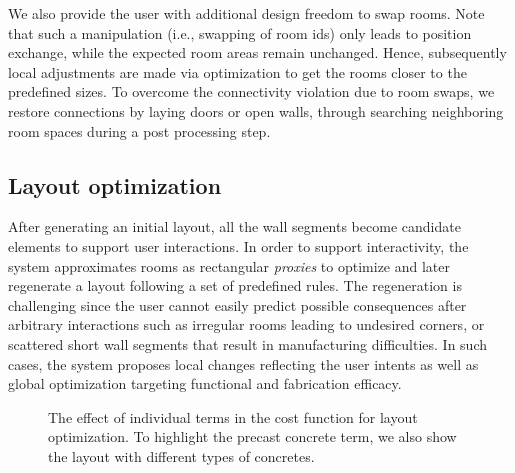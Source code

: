 We also provide the user with additional design freedom to swap rooms. Note that such a manipulation (i.e., swapping of room ids) only leads to position exchange, while the expected room areas remain unchanged. Hence, subsequently local adjustments are made via optimization to get the rooms closer to the predefined sizes. To overcome the connectivity violation due to room swaps, we restore connections by laying doors or open walls, through searching neighboring room spaces during a post processing step.

\subsection{Layout optimization}

After generating an initial layout, all the wall segments become candidate elements to support user interactions. In order to support interactivity, the system approximates rooms as rectangular {\em proxies} to optimize and later regenerate a layout following a set of predefined rules. The regeneration is challenging since the user cannot easily predict possible consequences after arbitrary interactions such as irregular rooms leading to undesired corners, or scattered short wall segments that result in manufacturing difficulties. In such cases, the system proposes local changes reflecting the user intents as well as global optimization targeting functional and fabrication efficacy.

\begin{figure*}[t!]
\centering
{}
\caption{The effect of individual terms in the cost function for layout optimization. To highlight the precast concrete term, we also show the layout with different types of concretes.}
\label{fig:costFunc}
\vspace{-.1in}
\end{figure*}

